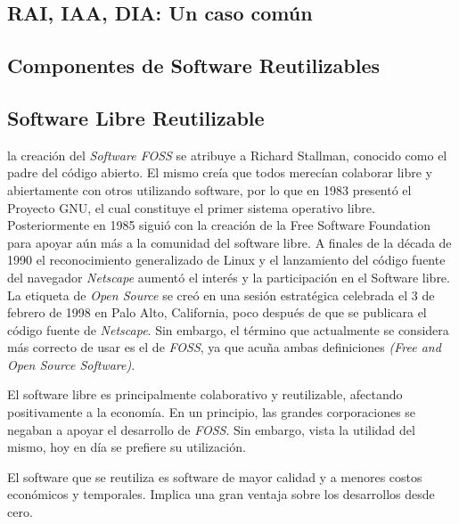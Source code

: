 \subsection{RAI, IAA, DIA: Un caso común}

\subsection{Componentes de Software Reutilizables}


\subsection{Software Libre Reutilizable}

la creación del \textit{Software FOSS} se atribuye a Richard Stallman, conocido como el padre del código abierto. El mismo creía que todos merecían colaborar libre y abiertamente con otros utilizando software, por lo que en 1983 presentó el Proyecto GNU, el cual constituye el primer sistema operativo libre. Posteriormente en 1985 siguió con la creación de la Free Software Foundation para apoyar aún más a la comunidad del software libre. A finales de la década de 1990 el reconocimiento generalizado de Linux y el lanzamiento del código fuente del navegador \textit{Netscape} aumentó el interés y la participación en el Software libre. La etiqueta de \textit{Open Source} se creó en una sesión estratégica celebrada el 3 de febrero de 1998 en Palo Alto, California, poco después de que se publicara el código fuente de \textit{Netscape}. Sin embargo, el término que actualmente se considera más correcto de usar es el de \textit{FOSS}, ya que acuña ambas definiciones \textit{(Free and Open Source Software)}.

El software libre es principalmente colaborativo y reutilizable, afectando positivamente a la economía. En un principio, las grandes corporaciones se negaban a apoyar el desarrollo de \textit{FOSS}. Sin embargo, vista la utilidad del mismo, hoy en día se prefiere su utilización.

El software que se reutiliza es software de mayor calidad y a menores costos económicos y temporales. Implica una gran ventaja sobre los desarrollos desde cero.